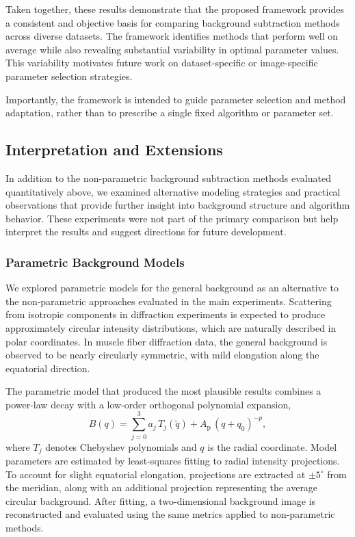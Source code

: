 \documentclass[iucr]{iucrjournals}
\begin{document}
Taken together, these results demonstrate that the proposed framework provides a consistent and objective basis for comparing background subtraction methods across diverse datasets. The framework identifies methods that perform well on average while also revealing substantial variability in optimal parameter values. This variability motivates future work on dataset-specific or image-specific parameter selection strategies. 

Importantly, the framework is intended to guide parameter selection and method adaptation, rather than to prescribe a single fixed algorithm or parameter set.


\subsection{Interpretation and Extensions}

In addition to the non-parametric background subtraction methods evaluated quantitatively above, we examined alternative modeling strategies and practical observations that provide further insight into background structure and algorithm behavior. These experiments were not part of the primary comparison but help interpret the results and suggest directions for future development.

\subsubsection{Parametric Background Models}

We explored parametric models for the general background as an alternative to the non-parametric approaches evaluated in the main experiments. Scattering from isotropic components in diffraction experiments is expected to produce approximately circular intensity distributions, which are naturally described in polar coordinates. In muscle fiber diffraction data, the general background is observed to be nearly circularly symmetric, with mild elongation along the equatorial direction.

The parametric model that produced the most plausible results combines a power-law decay with a low-order orthogonal polynomial expansion,
\begin{equation}
B(q) = \sum_{j=0}^{3} a_j\, T_j(\tilde q) + A_{\mathrm{p}}\, (q + q_0)^{-p},
\end{equation}
where $T_j$ denotes Chebyshev polynomials and $q$ is the radial coordinate. Model parameters are estimated by least-squares fitting to radial intensity projections. To account for slight equatorial elongation, projections are extracted at $\pm 5^{\circ}$ from the meridian, along with an additional projection representing the average circular background. After fitting, a two-dimensional background image is reconstructed and evaluated using the same metrics applied to non-parametric methods.
\end{document}
